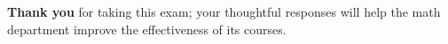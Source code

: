 \documentclass{ximera}
\begin{document}
\textbf{Thank you} for taking this exam; your thoughtful responses
will help the math department improve the effectiveness of its
courses.
\end{document}
